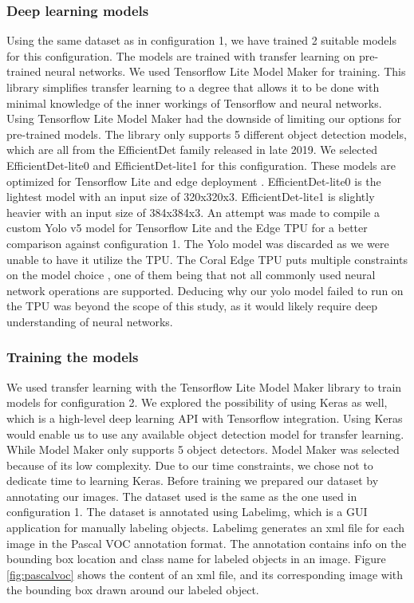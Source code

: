 \subsubsection{Deep learning models}

Using the same dataset as in configuration 1, we have trained 2 suitable models for this configuration. The models are trained with transfer learning on pre-trained neural networks. We used Tensorflow Lite Model Maker for training. This library simplifies transfer learning to a degree that allows it to be done with minimal knowledge of the inner workings of Tensorflow and neural networks. Using Tensorflow Lite Model Maker had the downside of limiting our options for pre-trained models. The library only supports 5 different object detection models, which are all from the EfficientDet family released in late 2019. We selected EfficientDet-lite0 and EfficientDet-lite1 for this configuration. These models are optimized for Tensorflow Lite and edge deployment \cite{efficientDetLite0} \cite{efficientDetLite1}. EfficientDet-lite0 is the lightest model with an input size of 320x320x3. EfficientDet-lite1 is slightly heavier with an input size of 384x384x3. An attempt was made to compile a custom Yolo v5 model for Tensorflow Lite and the Edge TPU for a better comparison against configuration 1. The Yolo model was discarded as we were unable to have it utilize the TPU. The Coral Edge TPU puts multiple constraints on the model choice \cite{edgetpuModels}, one of them being that not all commonly used neural network operations are supported. Deducing why our yolo model failed to run on the TPU was beyond the scope of this study, as it would likely require deep understanding of neural networks.\\

\subsubsection{Training the models}

We used transfer learning with the Tensorflow Lite Model Maker library to train models for configuration 2. We explored the possibility of using Keras as well, which is a high-level deep learning API with Tensorflow integration. Using Keras would enable us to use any available object detection model for transfer learning. While Model Maker only supports 5 object detectors. Model Maker was selected because of its low complexity. Due to our time constraints, we chose not to dedicate time to learning Keras.
Before training we prepared our dataset by annotating our images. The dataset used is the same as the one used in configuration 1.
The dataset is annotated using Labelimg, which is a GUI application for manually labeling objects. Labelimg generates an xml file for each image in the Pascal VOC annotation format. The annotation contains info on the bounding box location and class name for labeled objects in an image. Figure \ref{fig:pascalvoc} shows the content of an xml file, and its corresponding image with the bounding box drawn around our labeled object.

